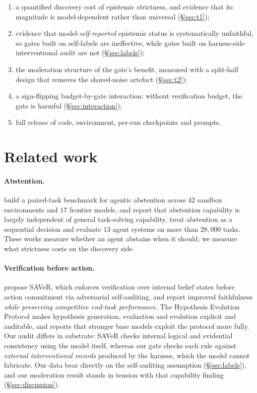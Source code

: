 \documentclass[11pt]{article}
\begin{document}
\begin{enumerate}\itemsep2pt
\item a quantified discovery cost of epistemic strictness, and evidence that its magnitude
is model-dependent rather than universal (\S\ref{sec:t1});
\item evidence that model-\emph{self-reported} epistemic status is systematically
unfaithful, so gates built on self-labels are ineffective, while gates built on
harness-side interventional audit are not (\S\ref{sec:labels});
\item the moderation structure of the gate's benefit, measured with a split-half design
that removes the shared-noise artefact (\S\ref{sec:t2});
\item a sign-flipping budget-by-gate interaction: without verification budget, the gate is
harmful (\S\ref{sec:interaction});
\item full release of code, environment, per-run checkpoints and prompts.
\end{enumerate}

\section{Related work}

\paragraph{Abstention.} \citet{agentabstain} build a paired-task benchmark for agentic
abstention across $42$ sandbox environments and $17$ frontier models, and report that
abstention capability is largely independent of general task-solving capability.
\citet{agenticabstention} treat abstention as a sequential decision and evaluate $13$ agent
systems on more than $28{,}000$ tasks. These works measure whether an agent abstains when it
should; we measure what strictness costs on the discovery side.

\paragraph{Verification before action.} \citet{saver} propose SAVeR, which enforces
verification over internal belief states before action commitment via adversarial
self-auditing, and report improved faithfulness \emph{while preserving competitive
end-task performance}. The Hypothesis Evolution Protocol \citep{hep} makes hypothesis generation, evaluation
and evolution explicit and auditable, and reports that stronger base models exploit the
protocol more fully. Our audit differs in
substrate: SAVeR checks internal logical and evidential consistency using the model itself,
whereas our gate checks each rule against \emph{external interventional records} produced by
the harness, which the model cannot fabricate. Our data bear directly on the self-auditing
assumption (\S\ref{sec:labels}), and our moderation result stands in tension with
that capability finding (\S\ref{sec:discussion}).
\end{document}
